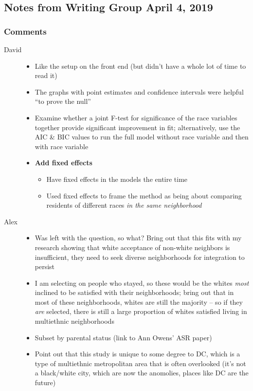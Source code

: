\documentclass{baderart}
\providecommand{\tightlist}{%
  \setlength{\itemsep}{0pt}\setlength{\parskip}{0pt}}
\begin{document}
\subsection{Notes from Writing Group April 4, 2019}\label{notes-from-writing-group-april-4-2019}

\subsubsection{Comments}\label{comments}

\begin{description} \item[David] \begin{itemize} \tightlist \item   Like the setup on the front end (but didn't have a whole lot of time   to read it) \item   The graphs with point estimates and confidence intervals were helpful   ``to prove the null'' \item   Examine whether a joint F-test for significance of the race variables   together provide significant improvement in fit; alternatively, use   the AIC \& BIC values to run the full model without race variable and   then with race variable \item   \textbf{Add fixed effects}

  \begin{itemize}   \tightlist   \item     Have fixed effects in the models the entire time   \item     Used fixed effects to frame the method as being about comparing     residents of different races \emph{in the same neighborhood}   \end{itemize} \end{itemize} \item[Alex] \begin{itemize} \tightlist \item   Was left with the question, so what? Bring out that this fits with my   research showing that white acceptance of non-white neighbors is   insufficient, they need to seek diverse neighborhoods for integration   to persist \item   I am selecting on people who stayed, so these would be the whites   \emph{most} inclined to be satisfied with their neighborhoods; bring   out that in most of these neighborhoods, whites are still the majority   -- so if they \emph{are} selected, there is still a large proportion   of whites satisfied living in multiethnic neighborhoods \item   Subset by parental status (link to Ann Owens' ASR paper) \item   Point out that this study is unique to some degree to DC, which is a   type of multiethnic metropolitan area that is often overlooked (it's   not a black/white city, which are now the anomolies, places like DC   are the future) \end{itemize} \end{description}
\end{document}
